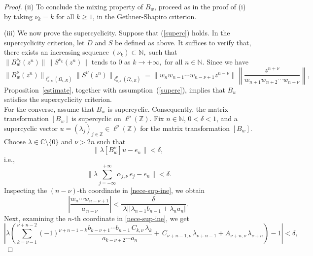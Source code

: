 \documentclass[12pt, reqno]{amsart}
\theoremstyle{definition}
\theoremstyle{remark}
\numberwithin{equation}{section}
\begin{document}
\begin{proof}
        
       (ii) To conclude the mixing property of $B_w$, proceed as in the proof of (i) by taking $\nu_k=k$ for all $k\geq 1$, in the Gethner-Shapiro criterion. \vspace{3mm}

        (iii) We now prove the supercyclicity. Suppose that (\ref{superc}) holds. In the supercyclicity criterion, let $D$ and $S$ be defined as above. It suffices to verify that, there exists an increasing sequence $(\nu_{k})\subset \mathbb{N},$ such that
        $ \lVert B^{\nu_{k}}_{w}(z^{n}) \rVert \lVert S^{\nu_{k}}(z^{n}) \rVert$ tends to 0 as $k\to +\infty,$ for all $n\in \mathbb{N}.$ Since we have
        \[
         \lVert B^{\nu}_{w}(z^{n}) \rVert_{\ell^{p}_{a,b}(\Omega_{r,R})} \lVert S^{\nu}(z^{n}) \rVert_{\ell^{p}_{a,b}(\Omega_{r,R})}=\lVert   w_{n}w_{n-1}\cdots w_{n-\nu+1}z^{n-\nu} \rVert\left\lVert \frac{z^{n
         +\nu}}{w_{n+1}w_{n+2}\cdots w_{n+\nu}}\right\rVert,
        \]
        Proposition~\ref{estimate}, together with assumption~(\ref{superc}),  implies that \(B_w\) satisfies the supercyclicity criterion.\\
               For the converse, assume that $B_{w}$ is supercyclic. Consequently, the matrix transformation $[B_w]$ is supercyclic on $\ell^p(\mathbb{Z})$. Fix $n\in \mathbb{N}$, $0<\delta<1$, and a supercyclic vector 
$u=(\lambda_j)_{j\in\mathbb{Z}}\in \ell^{p}(\mathbb{Z})$ for the matrix transformation $[B_w]$. Choose $\lambda \in \mathbb{C}\setminus\{0\}$ and $\nu>2n$ such that  
\begin{equation}
    \|\lambda[B_w^\nu]u - e_n\| < \delta,
\end{equation}
i.e., 
\begin{equation}\label{nece-sup-ine}
 ~\Big\lVert \lambda\sum_{j=-\infty}^{+\infty} \alpha_{j,\nu}\, e_{j}- e_{n}\Big\rVert < \delta.
\end{equation}
Inspecting the $(n-\nu)$-th coordinate in \eqref{nece-sup-ine}, we obtain  
\begin{equation}\label{conver-super1}
     \left|\frac{w_n\cdots w_{n-\nu+1}}{a_{\,n-\nu}}\right|
        < \frac{\delta}{|\lambda|\left|\lambda_{n-1} b_{n-1}+\lambda_n a_n\right|}.
\end{equation}
Next, examining the $n$-th coordinate in \eqref{nece-sup-ine}, we get
\[
\left\lvert\lambda\left(\sum_{k=\nu-1}^{\nu+n-2}
(-1)^{\nu+n-1-k}
\frac{b_{k-\nu+1}\cdots b_{n-1}\,C_{k,\nu}\,\lambda_{k}}
     {a_{k-\nu+2}\cdots a_{n}}+\,C_{\nu+n-1,\nu}\,\lambda_{\nu+n-1}
      +A_{\nu+n,\nu}\,\lambda_{\nu+n}\right)-1\right\rvert<\delta,
\]
\end{proof}
\end{document}
